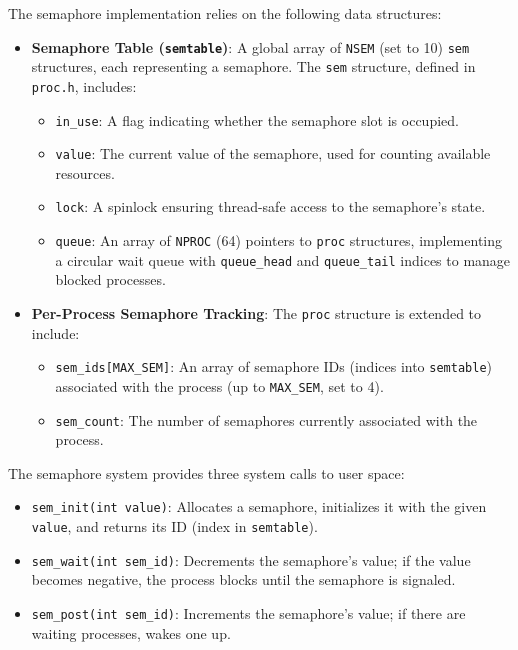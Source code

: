 \documentclass[12pt]{article}
\begin{document}
The semaphore implementation relies on the following data structures:
\begin{itemize}
  \item \textbf{Semaphore Table (\texttt{semtable})}: A global array of \texttt{NSEM} (set to 10) \texttt{sem} structures, each representing a semaphore. The \texttt{sem} structure, defined in \texttt{proc.h}, includes:
    \begin{itemize}
      \item \texttt{in\_use}: A flag indicating whether the semaphore slot is occupied.
      \item \texttt{value}: The current value of the semaphore, used for counting available resources.
      \item \texttt{lock}: A spinlock ensuring thread-safe access to the semaphore’s state.
      \item \texttt{queue}: An array of \texttt{NPROC} (64) pointers to \texttt{proc} structures, implementing a circular wait queue with \texttt{queue\_head} and \texttt{queue\_tail} indices to manage blocked processes.
    \end{itemize}
  \item \textbf{Per-Process Semaphore Tracking}: The \texttt{proc} structure is extended to include:
    \begin{itemize}
      \item \texttt{sem\_ids[MAX\_SEM]}: An array of semaphore IDs (indices into \texttt{semtable}) associated with the process (up to \texttt{MAX\_SEM}, set to 4).
      \item \texttt{sem\_count}: The number of semaphores currently associated with the process.
    \end{itemize}
\end{itemize}

The semaphore system provides three system calls to user space:
\begin{itemize}
  \item \texttt{sem\_init(int value)}: Allocates a semaphore, initializes it with the given \texttt{value}, and returns its ID (index in \texttt{semtable}).
  \item \texttt{sem\_wait(int sem\_id)}: Decrements the semaphore’s value; if the value becomes negative, the process blocks until the semaphore is signaled.
  \item \texttt{sem\_post(int sem\_id)}: Increments the semaphore’s value; if there are waiting processes, wakes one up.
\end{itemize}
\end{document}
